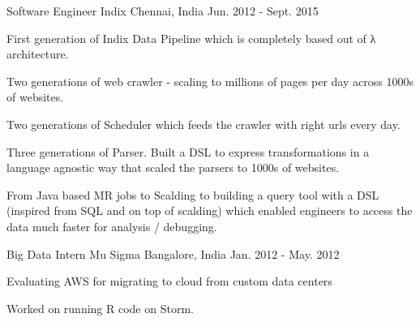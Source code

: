 \begin{cventries}
  \cventry
    {Software Engineer} %
    {Indix} %
    {Chennai, India} %
    {Jun. 2012 - Sept. 2015} %
    {
      \begin{cvitems} %
        \item {First generation of Indix Data Pipeline which is completely based out of λ architecture. }
        \item {Two generations of web crawler - scaling to millions of pages per day across 1000s of websites. }
        \item {Two generations of Scheduler which feeds the crawler with right urls every day. }
        \item {Three generations of Parser. Built a DSL to express transformations in a language agnostic way that scaled the parsers to 1000s of websites. }
        \item {From Java based MR jobs to Scalding to building a query tool with a DSL (inspired from SQL and on top of scalding) which enabled engineers to access the data much faster for analysis / debugging. }
      \end{cvitems}
    }

  \cventry
    {Big Data Intern} %
    {Mu Sigma} %
    {Bangalore, India} %
    {Jan. 2012 - May. 2012} %
    {
      \begin{cvitems} %
        \item {Evaluating AWS for migrating to cloud from custom data centers}
        \item {Worked on running R code on Storm.}
      \end{cvitems}
    }

\end{cventries}
